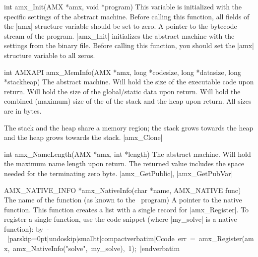 \syntaxp int amx_Init(AMX *amx, void *program)
        This variable is initialized with the specific settings of the abstract
        machine. Before calling this function, all fields of the |amx|
        structure variable should be set to zero.
        A pointer to the bytecode stream of the program.
\notes
        |amx_Init| initializes the abstract machine with the settings from the
        binary file. Before calling this function, you should set the |amx|
        structure variable to all zeros.


\syntaxp int AMXAPI amx_MemInfo(AMX *amx, long *codesize, long *datasize, long *stackheap)
        The abstract machine.
        Will hold the size of the executable code upon return.
        Will hold the size of the global\slash static data upon return.
        Will hold the combined (maximum) size of the of the stack and the heap
        upon return.
\notes
    All sizes are in bytes.

    The stack and the heap share a memory region; the stack grows towards the
    heap and the heap grows towards the stack.
\seealso
    |amx_Clone|

\syntaxp int amx_NameLength(AMX *amx, int *length)
        The abstract machine.
        Will hold the maximum name length upon return. The returned value
        includes the space needed for the terminating zero byte.
\seealso
    |amx_GetPublic|, |amx_GetPubVar|

\syntaxp AMX_NATIVE_INFO *amx_NativeInfo(char *name, AMX_NATIVE func)
        The name of the function (as known to the \Small\ program)
        A pointer to the native function.
\notes
    This function creates a list with a single record for |amx_Register|. To
    register a single function, use the code snippet (where |my_solve| is a
    native function):
    \lbreak\hbox{\vbox{\advance \hsize by -\funrefindent \noindent
\listingx\verbatim|parskip=0pt|undoskip|smalltt|compactverbatim|Ccode
err = amx_Register(amx, amx_NativeInfo("solve", my_solve), 1);
|endverbatim\endlistingx
    }}%

